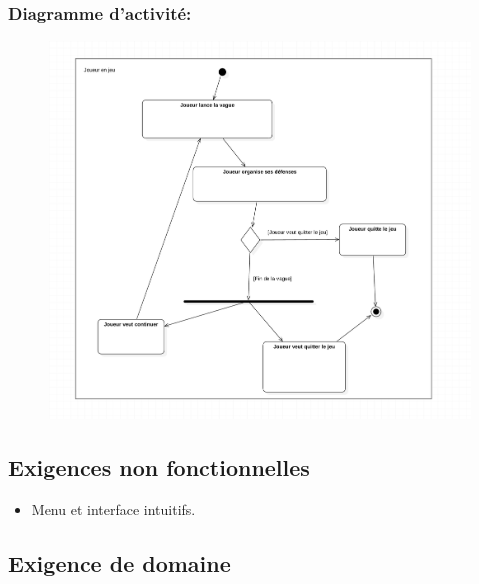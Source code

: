 \documentclass[10pt,a4paper]{article}
\begin{document}
\newpage
\subsubsection{Diagramme d'activité:}

\begin{center}
    \includegraphics[height=10cm,width=16cm]{joueur_en_jeu.png}
\end{center}
    
\subsection{Exigences non fonctionnelles}

\begin{itemize}
    \item Menu et interface intuitifs. 
\end{itemize}
    
\subsection{Exigence de domaine}
\end{document}
